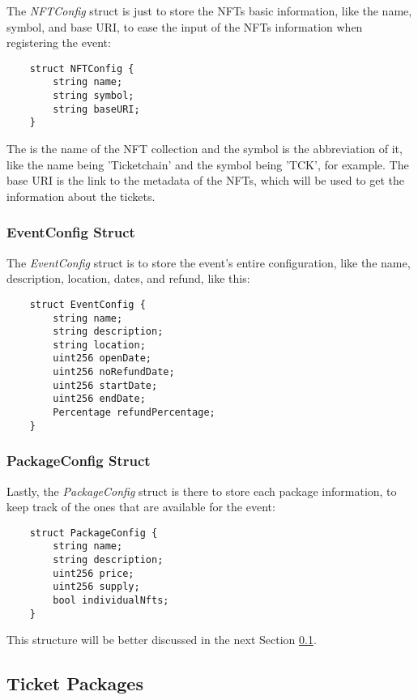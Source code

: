 The \textit{NFTConfig} struct is just to store the NFTs basic information, like the name, symbol, and base URI, to ease the input of the NFTs information when registering the event:
\begin{verbatim}
    struct NFTConfig {
        string name;
        string symbol;
        string baseURI;
    }
\end{verbatim}
The is the name of the NFT collection and the symbol is the abbreviation of it, like the name being 'Ticketchain' and the symbol being 'TCK', for example. The base URI is the link to the metadata of the NFTs, which will be used to get the information about the tickets.

\subsubsection{EventConfig Struct}
\label{subsubsec:eventconfig_struct}

The \textit{EventConfig} struct is to store the event's entire configuration, like the name, description, location, dates, and refund, like this:
\begin{verbatim}
    struct EventConfig {
        string name;
        string description;
        string location;
        uint256 openDate;
        uint256 noRefundDate;
        uint256 startDate;
        uint256 endDate;
        Percentage refundPercentage;
    }
\end{verbatim}

\subsubsection{PackageConfig Struct}
\label{subsubsec:packageconfig_struct}

Lastly, the \textit{PackageConfig} struct is there to store each package information, to keep track of the ones that are available for the event:
\begin{verbatim}
    struct PackageConfig {
        string name;
        string description;
        uint256 price;
        uint256 supply;
        bool individualNfts;
    }
\end{verbatim}
This structure will be better discussed in the next Section \ref{subsec:ticket_packages}.

\subsection{Ticket Packages}
\label{subsec:ticket_packages}

